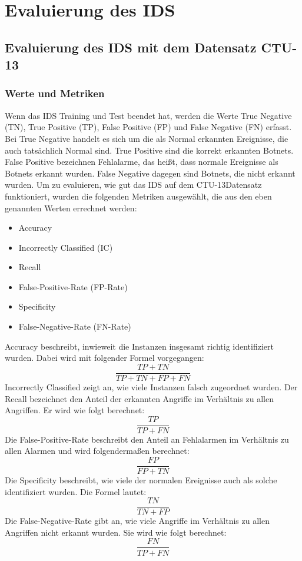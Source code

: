 \documentclass[main.tex]{subfiles}
\begin{document}
\section{Evaluierung des IDS}
\subsection{Evaluierung des IDS mit dem Datensatz CTU-13}

\subsubsection{Werte und Metriken} \label{subsubsec:WerteMetriken}
Wenn das IDS Training und Test beendet hat, werden die Werte True Negative (TN), True Positive (TP), False Positive (FP) und False Negative (FN) erfasst. Bei True Negative handelt es sich um die als Normal erkannten Ereignisse, die auch tatsächlich Normal sind. True Positive sind die korrekt erkannten Botnets. False Positive bezeichnen Fehlalarme, das heißt, dass normale Ereignisse als Botnets erkannt wurden. False Negative dagegen sind Botnets, die nicht erkannt wurden.
Um zu evaluieren, wie gut das IDS auf dem CTU-13Datensatz funktioniert, wurden die folgenden Metriken ausgewählt, die aus den eben genannten Werten errechnet werden:

\begin{itemize}
\item Accuracy
\item Incorrectly Classified (IC)
\item Recall
\item False-Positive-Rate (FP-Rate)
\item Specificity
\item False-Negative-Rate (FN-Rate)
\end{itemize}

Accuracy beschreibt, inwieweit die Instanzen insgesamt richtig identifiziert wurden. Dabei wird mit folgender Formel vorgegangen:
\begin{equation}
\frac{TP + TN}{TP + TN + FP + FN}
\end{equation}
Incorrectly Classified zeigt an, wie viele Instanzen falsch zugeordnet wurden.
Der Recall bezeichnet den Anteil der erkannten Angriffe im Verhältnis zu allen Angriffen. Er wird wie folgt berechnet:
\begin{equation}
\frac{TP}{TP +  FN}
\end{equation}
Die False-Positive-Rate beschreibt den Anteil an Fehlalarmen im Verhältnis zu allen Alarmen und wird folgendermaßen berechnet:
\begin{equation}
\frac{FP}{FP + TN}
\end{equation}
Die Specificity beschreibt, wie viele der normalen Ereignisse auch als solche identifiziert wurden. Die Formel lautet:
\begin{equation}
\frac{TN}{TN + FP}
\end{equation}
Die False-Negative-Rate gibt an, wie viele Angriffe im Verhältnis zu allen Angriffen nicht erkannt wurden. Sie wird wie folgt berechnet:
\begin{equation}
\frac{FN}{TP + FN}
\end{equation}
\end{document}

